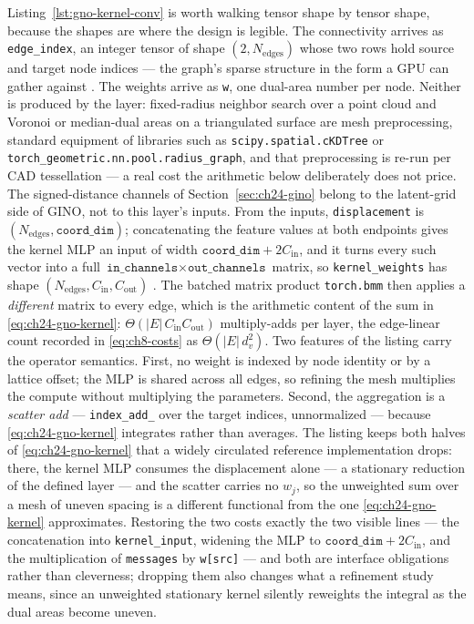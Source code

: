 Listing~\ref{lst:gno-kernel-conv} is worth walking tensor shape by tensor shape, because the
shapes are where the design is legible. The connectivity arrives as \texttt{edge\_index}, an
integer tensor of shape $(2, N_{\text{edges}})$ whose two rows hold source and target node
indices --- the graph's sparse structure in the form a GPU can gather against
. The weights arrive as \texttt{w}, one
dual-area number per node. Neither is produced by the layer: fixed-radius neighbor
search over a point cloud and Voronoi or median-dual areas on a triangulated
surface are mesh preprocessing, standard
equipment of libraries such as \texttt{scipy.spatial.cKDTree} or
\texttt{torch\_geometric.nn.pool.radius\_graph}, and that preprocessing is re-run per CAD
tessellation --- a real cost the arithmetic below deliberately does not price. The
signed-distance channels of Section~\ref{sec:ch24-gino} belong to the latent-grid side
of GINO, not to this layer's inputs.
From the inputs, \texttt{displacement} is
$(N_{\text{edges}}, \texttt{coord\_dim})$; concatenating the feature values at both
endpoints gives the kernel MLP an input of width $\texttt{coord\_dim} + 2C_{\text{in}}$, and
it turns every such vector into a full
$\texttt{in\_channels} \times \texttt{out\_channels}$ matrix, so
\texttt{kernel\_weights} has shape $(N_{\text{edges}}, C_{\text{in}}, C_{\text{out}})$
. The batched matrix product \texttt{torch.bmm} then applies a
\emph{different} matrix to every edge, which is the arithmetic content of the sum in
\eqref{eq:ch24-gno-kernel}: $\Theta(|E|\,C_{\text{in}} C_{\text{out}})$ multiply-adds per
layer, the edge-linear count recorded in \eqref{eq:ch8-costs} as $\Theta(|E|\,d_v^{2})$. Two
features of the listing carry the operator semantics. First, no weight is indexed by node identity or by a lattice offset; the MLP is
shared across all edges, so refining the mesh multiplies the compute without multiplying the
parameters. Second, the aggregation is a \emph{scatter add} --- \texttt{index\_add\_} over the
target indices, unnormalized
---
because \eqref{eq:ch24-gno-kernel} integrates rather than averages. The listing keeps both
halves of \eqref{eq:ch24-gno-kernel} that a widely circulated reference implementation
drops: there, the kernel MLP consumes the displacement alone --- a stationary reduction of
the defined layer --- and the scatter carries no $w_j$, so the unweighted sum over a mesh of
uneven spacing is a different functional from the one
\eqref{eq:ch24-gno-kernel} approximates. Restoring the two costs exactly the two visible
lines --- the concatenation into \texttt{kernel\_input}, widening the MLP to
$\texttt{coord\_dim} + 2C_{\text{in}}$, and the multiplication of \texttt{messages} by
\texttt{w[src]} --- and both are interface obligations rather than cleverness; dropping them
also changes what a refinement study means, since an unweighted stationary kernel silently
reweights the integral as the dual areas become uneven.

